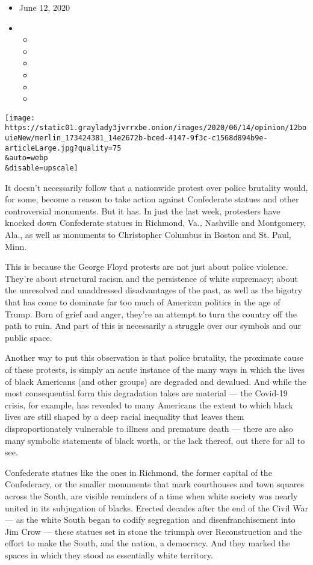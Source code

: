 \begin{itemize}
\item
  June 12, 2020
\item
  \begin{itemize}
  \item
  \item
  \item
  \item
  \item
  \item
  \end{itemize}
\end{itemize}

\texttt{[image: https://static01.graylady3jvrrxbe.onion/images/2020/06/14/opinion/12bouieNew/merlin\_173424381\_14e2672b-bced-4147-9f3c-c1568d894b9e-articleLarge.jpg?quality=75\\\&auto=webp\\\&disable=upscale]}

It doesn't necessarily follow that a nationwide protest over police
brutality would, for some, become a reason to take action against
Confederate statues and other controversial monuments. But it has. In
just the last week, protesters have knocked down Confederate statues in
Richmond, Va., Nashville and Montgomery, Ala., as well as monuments to
Christopher Columbus in Boston and St. Paul, Minn.

This is because the George Floyd protests are not just about police
violence. They're about structural racism and the persistence of white
supremacy; about the unresolved and unaddressed disadvantages of the
past, as well as the bigotry that has come to dominate far too much of
American politics in the age of Trump. Born of grief and anger, they're
an attempt to turn the country off the path to ruin. And part of this is
necessarily a struggle over our symbols and our public space.

Another way to put this observation is that police brutality, the
proximate cause of these protests, is simply an acute instance of the
many ways in which the lives of black Americans (and other groups) are
degraded and devalued. And while the most consequential form this
degradation takes are material --- the Covid-19 crisis, for example, has
revealed to many Americans the extent to which black lives are still
shaped by a deep racial inequality that leaves them disproportionately
vulnerable to illness and premature death --- there are also many
symbolic statements of black worth, or the lack thereof, out there for
all to see.

Confederate statues like the ones in Richmond, the former capital of the
Confederacy, or the smaller monuments that mark courthouses and town
squares across the South, are visible reminders of a time when white
society was nearly united in its subjugation of blacks. Erected decades
after the end of the Civil War --- as the white South began to codify
segregation and disenfranchisement into Jim Crow --- these statues set
in stone the triumph over Reconstruction and the effort to make the
South, and the nation, a democracy. And they marked the spaces in which
they stood as essentially white territory.

